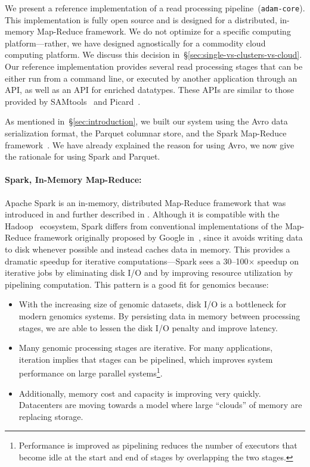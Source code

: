 \documentclass{bioinfo}
\begin{document}
We present a reference implementation of a read processing pipeline~(\texttt{adam-core}). This implementation is fully open source
and is designed for a distributed, in-memory Map-Reduce framework. We do not optimize for a specific computing platform---rather, we have designed
agnostically for a commodity cloud computing platform. We discuss this decision in~\S\ref{sec:single-vs-clusters-vs-cloud}. Our reference
implementation provides several read processing stages that can be either run from a command line, or executed by another application through
an API, as well as an API for enriched datatypes. These APIs are similar to those provided by SAMtools~\citep{li09} and Picard~\citep{picard}.

As mentioned in~\S\ref{sec:introduction}, we built our system using the Avro data serialization format, the Parquet columnar store, and the Spark Map-Reduce
framework~\citep{avro, parquet, zaharia10}. We have already explained the reason for using Avro, we now give the rationale for using Spark and Parquet.

\paragraph{Spark, In-Memory Map-Reduce:}
\label{sec:spark}

Apache Spark is an in-memory, distributed Map-Reduce framework that was introduced in \citet{zaharia10} and further described in \citet{zaharia12}.
Although it is compatible with the Hadoop~\citep{hadoop} ecosystem, Spark differs from conventional implementations of the Map-Reduce framework
originally proposed by Google in~\citep{dean08}, since it avoids writing data to disk whenever possible and instead caches
data in memory. This provides a dramatic speedup for iterative computations---Spark sees a 30--100$\times$ speedup on iterative jobs by eliminating
disk I/O and by improving resource utilization by pipelining computation. This pattern is a good fit for genomics because:

\begin{itemize}
\item With the increasing size of genomic datasets, disk I/O is a bottleneck for modern genomics systems. By persisting data in memory between processing stages,
we are able to lessen the disk I/O penalty and improve latency.
\item Many genomic processing stages are iterative. For many applications, iteration implies that stages can be pipelined, which improves system performance on large
parallel systems\footnote{Performance is improved as pipelining reduces the number of executors that become idle at the start and end of stages by overlapping the
two stages.}.
\item Additionally, memory cost and capacity is improving very quickly. Datacenters are moving towards a model where large ``clouds'' of memory are replacing storage.
\end{itemize}
\end{document}
